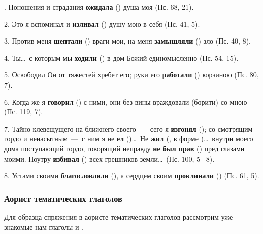 \documentclass[11pt,a4paper,oneside]{memoir}
\begin{document}
. Поношения и страдания \textbf{ожидала} ({}) душа моя (Пс. 68, 21).

2. Это я вспоминал и \textbf{изливал} ({}) душу мою в себя (Пс. 41, 5).

3. Против меня \textbf{шептали} ({}) враги мои, на меня \textbf{замышляли} ({}) зло (Пс. 40, 8).

4. Ты\ldots~с которым мы \textbf{ходили} ({}) в дом Божий единомысленно (Пс. 54, 15).

5. Освободил Он от тяжестей хребет его; руки его \textbf{работали} ({}) корзиною (Пс. 80, 7).

6. Когда же я \textbf{говорил} ({}) с ними, они без вины враждовали (борити) со мною (Пс. 119, 7).

7. Тайно клевещущего на ближнего своего~---~сего я \textbf{изгонял} ({}); со смотрящим гордо и ненасытным~---~с ним я не \textbf{ел} ({})\ldots~Не \textbf{жил} ({}, в форме {})\ldots~внутри моего дома поступающий гордо, говорящий неправду \textbf{не был прав} ({}) пред глазами моими. Поутру \textbf{избивал} ({}) всех грешников земли\ldots~(Пс. 100, 5\,--\,8).

8. Устами своими \textbf{благословляли} ({}), а сердцем своим \textbf{проклинали} ({}) (Пс. 61, 5).

\subsubsection{Аорист тематических глаголов}

Для образца спряжения в аористе тематических глаголов рассмотрим уже знакомые нам глаголы {} и {}.
\end{document}
